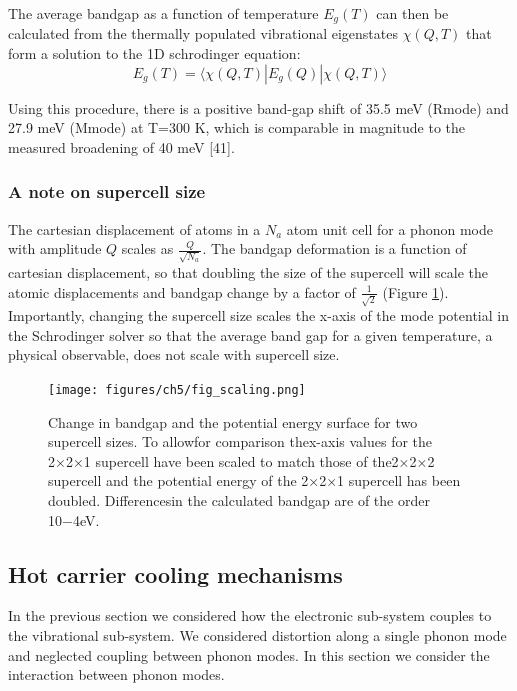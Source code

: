 The average bandgap as a function of temperature $E_g(T)$ can then be calculated from the thermally populated vibrational eigenstates $\chi(Q,T)$ that form a solution to the 1D schrodinger equation:
\begin{equation}
E_g(T) = \langle \chi(Q,T)|E_g(Q)|\chi(Q,T) \rangle
\end{equation}

Using this procedure, there is a positive band-gap shift of 35.5 meV (Rmode) and 27.9 meV (Mmode) at T=300 K, which is comparable in magnitude to the measured broadening of 40 meV [41]. 

\subsubsection{A note on supercell size}

The cartesian displacement of atoms in a $N_a$ atom unit cell for a phonon mode with amplitude $Q$ scales as $\frac{Q}{\sqrt{N_a}}$.\cite{}%
The bandgap deformation is a function of cartesian displacement, so that doubling the size of the supercell will scale the atomic displacements and bandgap change by a factor of $\frac{1}{\sqrt{2}}$ (Figure \ref{ch5scaling}).  %
Importantly, changing the supercell size scales the x-axis of the mode potential in the Schrodinger solver so that the average band gap for a given temperature, a physical observable, does not scale with supercell size.

\begin{figure}[]
\texttt{[image: figures/ch5/fig\_scaling.png]} \label{ch5scaling}
\caption[Change in bandgap and the potential energy surface for two supercell sizes. ]{
Change in bandgap and the potential energy surface for two supercell sizes.  To allowfor comparison thex-axis values for the 2×2×1 supercell have been scaled to match those of the2×2×2 supercell and the potential energy of the 2×2×1 supercell has been doubled.  Differencesin the calculated bandgap are of the order 10−4eV.
}
\end{figure}

\subsection{Hot carrier cooling mechanisms}
In the previous section we considered how the electronic sub-system couples to the vibrational sub-system. We considered distortion along a single phonon mode and neglected coupling between phonon modes. In this section we consider the interaction between phonon modes.

